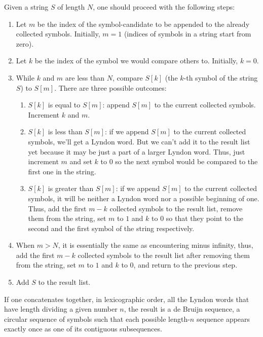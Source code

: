 Given a string $S$ of length $N$, one should proceed with the following steps:

\begin{enumerate}
\item Let $m$ be the index of the symbol-candidate to be appended to the already collected symbols. Initially, $m = 1$ (indices of symbols in a string start from zero).
\item Let $k$ be the index of the symbol we would compare others to. Initially, $k = 0$.
\item While $k$ and $m$ are less than $N$, compare $S[k]$ (the $k$-th symbol of the string $S$) to $S[m]$. There are three possible outcomes:
\begin{enumerate}
\item $S[k]$ is equal to $S[m]$: append $S[m]$ to the current collected symbols. Increment $k$ and $m$.
\item $S[k]$ is less than $S[m]$: if we append $S[m]$ to the current collected symbols, we'll get a Lyndon word. But we can't add it to the result list yet because it may be just a part of a larger Lyndon word. Thus, just increment $m$ and set $k$ to $0$ so the next symbol would be compared to the first one in the string.
\item $S[k]$ is greater than $S[m]$: if we append $S[m]$ to the current collected symbols, it will be neither a Lyndon word nor a possible beginning of one. Thus, add the first $m-k$ collected symbols to the result list, remove them from the string, set $m$ to $1$ and $k$ to $0$ so that they point to the second and the first symbol of the string respectively.
\end{enumerate}
\item When $m > N$, it is essentially the same as encountering minus infinity, thus, add the first $m-k$ collected symbols to the result list after removing them from the string, set $m$ to $1$ and $k$ to $0$, and return to the previous step.
\item Add $S$ to the result list.
\end{enumerate}

If one concatenates together, in lexicographic order, all the Lyndon words that have length dividing a given number $n$, the result is a de Bruijn sequence, a circular sequence of symbols such that each possible length-$n$ sequence appears exactly once as one of its contiguous subsequences.


